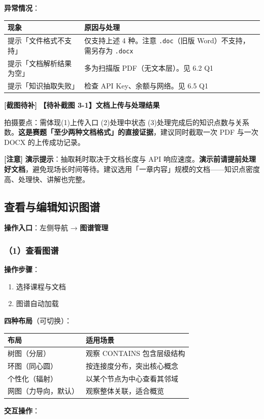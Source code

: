 \documentclass[UTF8,a4paper,11pt]{ctexrep}
\newcommand{\shotmark}{\textcolor{todobar}{\textbf{[截图待补]}}}
\newcommand{\warnmark}{\textcolor{todobar}{\textbf{[注意]}}}
\begin{document}
\textbf{异常情况}：

\begin{center}
\small
\begin{tabularx}{\linewidth}{@{}XX@{}}
\toprule
现象 & 原因与处理 \\
\midrule
提示「文件格式不支持」 & 仅支持上述 4 种。注意 \texttt{.doc}（旧版 Word）不支持，需另存为 \texttt{.docx} \\
提示「文档解析结果为空」 & 多为扫描版 PDF（无文本层）。见 6.2 Q1 \\
提示「知识抽取失败」 & 检查 API Key、余额与网络。见 6.5 Q1 \\
\bottomrule
\end{tabularx}
\end{center}
\begin{todobox}
\shotmark{} \textbf{【待补截图 3-1】文档上传与处理结果}

拍摄要点：需体现(1)上传入口 (2)处理中状态 (3)处理完成后的知识点数与关系数。\textbf{这是赛题「至少两种文档格式」的直接证据}，建议同时截取一次 PDF 与一次 DOCX 的上传成功记录。

\end{todobox}

\begin{todobox}
\warnmark{} \textbf{演示提示}：抽取耗时取决于文档长度与 API 响应速度。\textbf{演示前请提前处理好文档}，避免现场长时间等待。建议选用「一章内容」规模的文档——知识点密度高、处理快、讲解也完整。

\end{todobox}


\subsection{查看与编辑知识图谱}

\textbf{操作入口}：左侧导航 → \textbf{图谱管理}


\subsubsection{（1）查看图谱}

\textbf{操作步骤}：

\begin{enumerate}
\item 选择课程与文档
\item 图谱自动加载
\end{enumerate}
\textbf{四种布局}（可切换）：

\begin{center}
\small
\begin{tabularx}{\linewidth}{@{}XX@{}}
\toprule
布局 & 适用场景 \\
\midrule
树图（分层） & 观察 CONTAINS 包含层级结构 \\
环图（同心圆） & 按连接度分布，突出核心概念 \\
个性化（辐射） & 以某个节点为中心查看其邻域 \\
网图（力导向，默认） & 观察整体关联，适合概览 \\
\bottomrule
\end{tabularx}
\end{center}
\textbf{交互操作}：
\end{document}
